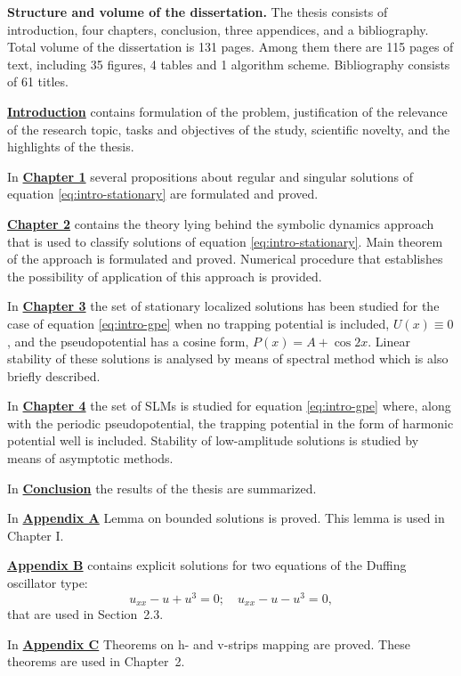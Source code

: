 \textbf{Structure and volume of the dissertation.}
The thesis consists of introduction, four chapters, conclusion, three appendices, and a bibliography.
Total volume of the dissertation is 131 pages.
Among them there are 115 pages of text, including 35 figures, 4 tables and 1 algorithm scheme.
Bibliography consists of 61 titles.

\textbf{\hyperref[introduction]{Introduction}} contains formulation of the problem, justification of the relevance of the research topic, tasks and objectives of the study, scientific novelty, and the highlights of the thesis.

In \textbf{\hyperref[chapter:I]{Chapter 1}} several propositions about regular and singular solutions of equation \eqref{eq:intro-stationary} are formulated and proved.

\textbf{\hyperref[chapter:II]{Chapter 2}} contains the theory lying behind the symbolic dynamics approach that is used to classify solutions of equation \eqref{eq:intro-stationary}.
Main theorem of the approach is formulated and proved.
Numerical procedure that establishes the possibility of application of this approach is provided.

In \textbf{\hyperref[chapter:III]{Chapter 3}} the set of stationary localized solutions has been studied for the case of equation \eqref{eq:intro-gpe} when no trapping potential is included, $U(x) \equiv 0$, and the pseudopotential has a cosine form, $P(x) = A + \cos 2x$.
Linear stability of these solutions is analysed by means of spectral method which is also briefly described.

In \textbf{\hyperref[chapter:IV]{Chapter 4}} the set of SLMs is studied for equation \eqref{eq:intro-gpe} where, along with the periodic pseudopotential, the trapping potential in the form of harmonic potential well is included.
Stability of low-amplitude solutions is studied by means of asymptotic methods.

In \textbf{\hyperref[conclusion]{Conclusion}} the results of the thesis are summarized.

In \textbf{\hyperref[appendix:lemma-on-bounded-solutions]{Appendix A}} Lemma on bounded solutions is proved.
This lemma is used in Chapter I.

\textbf{\hyperref[appendix:solutions-of-duffing-equations]{Appendix B}} contains explicit solutions for two equations of the Duffing oscillator type: 
\begin{equation}
	u_{xx} - u + u^3 = 0; \quad u_{xx} - u - u^3 = 0,
\end{equation}
that are used in Section~2.3. %

In \textbf{\hyperref[appendix:strips-mapping-theorems]{Appendix C}} Theorems on h- and v-strips mapping are proved.
These theorems are used in Chapter~2. %
